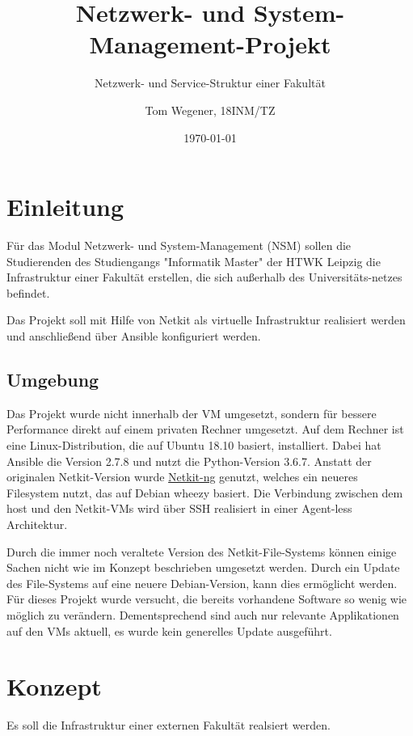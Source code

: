 \documentclass[a4paper]{article}
\title{Netzwerk- und System-Management-Projekt}
\subtitle{Netzwerk- und Service-Struktur einer Fakultät}
\date{\today}
\author{Tom Wegener, 18INM/TZ}
\begin{document}
\pagestyle{empty}

\maketitle

\newpage

\tableofcontents

\newpage

\pagestyle{fancy}

\setcounter{page}{1}

\section{Einleitung}
Für das Modul Netzwerk- und System-Management (NSM) sollen die Studierenden des Studiengangs "Informatik Master" der HTWK Leipzig die Infrastruktur einer Fakultät erstellen, die sich außerhalb des Universitäts-netzes befindet.

Das Projekt soll mit Hilfe von Netkit als virtuelle Infrastruktur realisiert werden und anschließend über Ansible konfiguriert werden.

\subsection{Umgebung}

Das Projekt wurde nicht innerhalb der VM umgesetzt, sondern für bessere Performance direkt auf einem privaten Rechner umgesetzt. Auf dem Rechner ist eine Linux-Distribution, die auf Ubuntu 18.10 basiert, installiert. Dabei hat Ansible die Version 2.7.8 und nutzt die Python-Version 3.6.7. Anstatt der originalen Netkit-Version wurde \href{https://netkit-ng.github.io/}{Netkit-ng} genutzt, welches ein neueres Filesystem nutzt, das auf Debian wheezy basiert.
Die Verbindung zwischen dem host und den Netkit-VMs wird über SSH realisiert in einer Agent-less Architektur.

Durch die immer noch veraltete Version des Netkit-File-Systems können einige Sachen nicht wie im Konzept beschrieben umgesetzt werden. Durch ein Update des File-Systems auf eine neuere Debian-Version, kann dies ermöglicht werden. Für dieses Projekt wurde versucht, die bereits vorhandene Software so wenig wie möglich zu verändern. Dementsprechend sind auch nur relevante Applikationen auf den VMs aktuell, es wurde kein generelles Update ausgeführt.

\newpage

\section{Konzept}
Es soll die Infrastruktur einer externen Fakultät realsiert werden.
\end{document}

